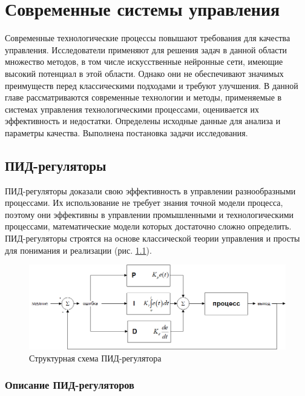 \chapter{Современные системы управления}

Современные технологические процессы повышают требования для качества управления. Исследователи применяют для решения задач в данной области множество методов, в том числе искусственные нейронные сети, имеющие высокий потенциал в этой области. Однако они не обеспечивают значимых преимуществ перед классическими подходами и требуют улучшения.
В данной главе рассматриваются современные технологии и методы, применяемые в системах управления технологическими процессами, оценивается их эффективность и недостатки. Определены исходные данные для анализа и параметры качества. Выполнена постановка задачи исследования.

\section{ПИД-регуляторы}

ПИД-регуляторы доказали свою эффективность в управлении разнообразными процессами. Их использование не требует знания точной модели процесса, поэтому они эффективны в управлении промышленными и технологическими процессами, математические модели которых достаточно сложно определить. ПИД-регуляторы строятся на основе классической теории управления и просты для понимания и реализации (рис. \ref{fig:PID_controller_scheme}).

\begin{figure}[H]
    \centering
    \includegraphics[width=\textwidth]{images/chapter1/Структурная схема ПИД-регулятора.png}
    \caption{Структурная схема ПИД-регулятора}
    \label{fig:PID_controller_scheme}
\end{figure}

\subsection{Описание ПИД-регуляторов}

